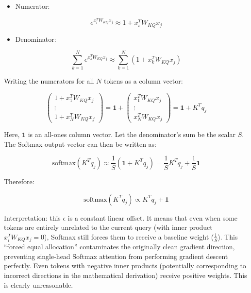 \begin{itemize}
\tightlist
\item
{}
  Numerator:
\end{itemize}

\[
e^{x_i^T W_{KQ}x_j} \approx 1 + x_i^T W_{KQ}x_j
\]

\begin{itemize}
\tightlist
\item
{}
  Denominator:
\end{itemize}

\[
\sum_{k=1}^{N} e^{x_k^T W_{KQ}x_j} \approx \sum_{k=1}^{N}(1+x_k^T W_{KQ}x_j)
\]

Writing the numerators for all \(N\) tokens as a column vector:

\[
\begin{pmatrix}
1+x_1^T W_{KQ}x_j \\
\vdots \\
1+x_N^T W_{KQ}x_j
\end{pmatrix}
= \mathbf{1}+
\begin{pmatrix}
x_1^T W_{KQ}x_j \\
\vdots \\
x_N^T W_{KQ}x_j
\end{pmatrix}
= \mathbf{1}+K^Tq_j
\]

Here, \(\mathbf{1}\) is an all-ones column vector. Let the denominator's sum be the scalar \(S\). The Softmax output vector can then be written as:

\[
\mathrm{softmax}(K^Tq_j) \approx \frac{1}{S}(\mathbf{1}+K^Tq_j)
= \frac{1}{S}K^Tq_j+\frac{1}{S}\mathbf{1}
\]

Therefore:

\[
\mathrm{softmax}(K^Tq_j) \propto K^Tq_j+\mathbf{1}
\]

Interpretation: this \(\epsilon\) is a constant linear offset. It means that even when some tokens are entirely unrelated to the current query (with inner product \(x_i^TW_{KQ}x_j=0\)), Softmax still forces them to receive a baseline weight (\(\frac{1}{S}\)). This ``forced equal allocation'' contaminates the originally clean gradient direction, preventing single-head Softmax attention from performing gradient descent perfectly.
Even tokens with negative inner products (potentially corresponding to incorrect directions in the mathematical derivation) receive positive weights. This is clearly unreasonable.

